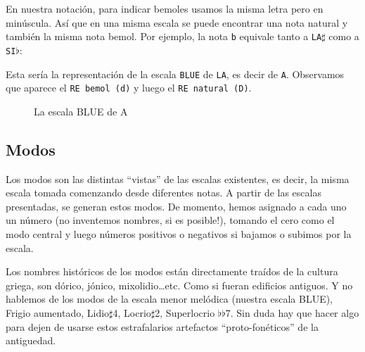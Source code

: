 \documentclass[]{report}
\begin{document}
En nuestra notación, para indicar bemoles usamos la misma letra pero en minúscula. Así que en una misma escala se puede encontrar una nota natural y también la misma nota bemol. Por ejemplo, la nota \texttt{b} equivale tanto a \texttt{LA$\sharp$} como a \texttt{SI$\flat$}: 

Esta sería la representación de la escala \texttt{BLUE} de \texttt{LA}, es decir de \texttt{A}. Observamos que aparece el \texttt{RE\ bemol\ (d)} y luego el \texttt{RE\ natural\ (D)}.
\begin{figure}[h]
 \centering
  \vspace{12pt}
  \caption{La escala BLUE de A}\label{fig:blue-scale-of-a}
\end{figure}

\subsection{Modos}
Los modos son las distintas ``vistas'' de las escalas existentes, es decir, la misma escala tomada comenzando desde diferentes notas.
A partir de las escalas presentadas, se generan estos modos. De momento, hemos asignado a cada uno un número (no inventemos nombres, si es posible!), tomando el cero como el modo central y luego números positivos o negativos si bajamos o subimos por la escala. 

Los nombres históricos de los modos están directamente traídos de la cultura griega, son \textsf{dórico}, \textsf{jónico}, \textsf{mixolidio}\ldots etc. Como si fueran edificios antiguos. Y no hablemos de los modos de la escala menor melódica (nuestra escala \textsf{BLUE}), \textsf{Frigio aumentado}, \textsf{Lidio$\sharp$4}, \textsf{Locrio$\sharp$2}, \textsf{Superlocrio $\flat$$\flat$7}. Sin duda hay que hacer algo para dejen de usarse estos estrafalarios artefactos ``proto-fonéticos'' de la antiguedad.
\end{document}
